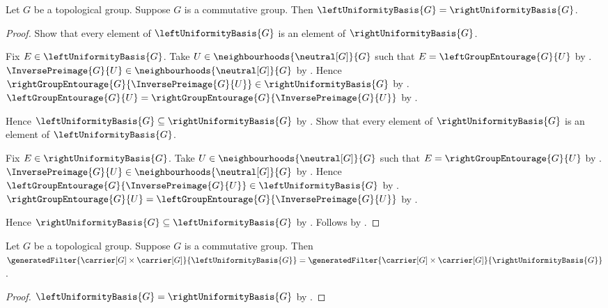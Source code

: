 \begin{theorem}\label{commutative_group_uniformity_bases_equal}
    Let $G$ be a topological group.
    Suppose $G$ is a commutative group.
    Then $\leftUniformityBasis{G}=\rightUniformityBasis{G}$.
\end{theorem}
\begin{proof}
    Show that every element of $\leftUniformityBasis{G}$ is an element of
        $\rightUniformityBasis{G}$.
    \begin{subproof}
        Fix $E\in\leftUniformityBasis{G}$.
        Take $U\in\neighbourhoods{\neutral[G]}{G}$ such that
            $E=\leftGroupEntourage{G}{U}$
            by .
        $\InversePreimage{G}{U}
            \in\neighbourhoods{\neutral[G]}{G}$
            by .
        Hence $\rightGroupEntourage{G}{\InversePreimage{G}{U}}
            \in\rightUniformityBasis{G}$
            by .
        $\leftGroupEntourage{G}{U}
            =\rightGroupEntourage{G}{\InversePreimage{G}{U}}$
            by .
    \end{subproof}
    Hence $\leftUniformityBasis{G}\subseteq\rightUniformityBasis{G}$
        by .
    Show that every element of $\rightUniformityBasis{G}$ is an element of
        $\leftUniformityBasis{G}$.
    \begin{subproof}
        Fix $E\in\rightUniformityBasis{G}$.
        Take $U\in\neighbourhoods{\neutral[G]}{G}$ such that
            $E=\rightGroupEntourage{G}{U}$
            by .
        $\InversePreimage{G}{U}
            \in\neighbourhoods{\neutral[G]}{G}$
            by .
        Hence $\leftGroupEntourage{G}{\InversePreimage{G}{U}}
            \in\leftUniformityBasis{G}$
            by .
        $\rightGroupEntourage{G}{U}
            =\leftGroupEntourage{G}{\InversePreimage{G}{U}}$
            by .
    \end{subproof}
    Hence $\rightUniformityBasis{G}\subseteq\leftUniformityBasis{G}$
        by .
    Follows by .
\end{proof}

\begin{corollary}\label{commutative_group_generated_uniformities_equal}
    Let $G$ be a topological group.
    Suppose $G$ is a commutative group.
    Then $\generatedFilter
        {\carrier[G]\times\carrier[G]}{\leftUniformityBasis{G}}
        =\generatedFilter
        {\carrier[G]\times\carrier[G]}{\rightUniformityBasis{G}}$.
\end{corollary}
\begin{proof}
    $\leftUniformityBasis{G}=\rightUniformityBasis{G}$
        by .
\end{proof}

